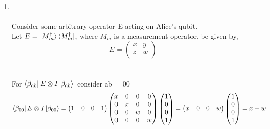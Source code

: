 \documentclass[a4paper,12pt]{article}
\begin{document}
\begin{enumerate}[label=(\alph*)]
    \item \phantom{1} \\~\\
    Consider some arbitrary operator E acting on Alice's qubit. \\
    Let $E = \ket{M^{\dagger}_{m}}\bra{M^{\dagger}_{m}}$, where $M_{m}$ is a measurement operator, be given by, \[E = \begin{pmatrix}
        x & y\\
        z & w \\
    \end{pmatrix}\] \\~\\
    For $\bra{\beta_{ab}}E \otimes I \ket{\beta_{ab}}$ consider ab = 00
    \[\bra{\beta_{00}}E \otimes I \ket{\beta_{00}} = \begin{pmatrix}
        1 & 0 & 0 & 1
    \end{pmatrix} \begin{pmatrix}
        x & 0 & 0 & 0 \\
        0 & x & 0 & 0 \\
        0 & 0 & w & 0 \\
        0 & 0 & 0 & w \\
    \end{pmatrix} \begin{pmatrix}
        1 \\
        0 \\
        0 \\
        1 \\
    \end{pmatrix} = \begin{pmatrix}
        x & 0 & 0 & w
    \end{pmatrix} \begin{pmatrix}
        1 \\
        0 \\
        0 \\
        1 \\
    \end{pmatrix} = x + w\]
    

\end{enumerate}
\end{document}
